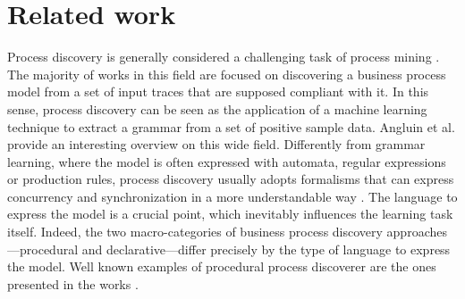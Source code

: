 \documentclass[a4wide,11pt]{article}
\theoremstyle{definition}
\theoremstyle{plain}
\begin{document}

\section{Related work}
\label{sec:related}

Process discovery is generally considered a challenging task of process mining \cite{2012-Maggi}. The majority of works in this field are focused on discovering a business process model from a set of input traces that are supposed compliant with it. In this sense, process discovery can be seen as the application of a machine learning technique to extract a grammar from a set of positive sample data. Angluin et al. \cite{1983-Angliun} provide an interesting overview on this wide field.
Differently from grammar learning, where the model is often expressed with automata, regular expressions or production rules, process discovery usually adopts formalisms that can express concurrency and synchronization in a more understandable way \cite{2009-Goedertier}. 
The language to express the model is a crucial point, which inevitably influences the learning task itself. Indeed, the two macro-categories of business process discovery approaches---procedural and declarative---differ precisely by the type of language to express the model.%
Well known examples of procedural process discoverer are the ones presented in the works \cite{2003-Weijters,2004-Aalst,2007-Gunther,2010-Aalst,2013-Leemans,2015-Guo,2017-Augusto, 2019-Augusto}. %
\end{document}
